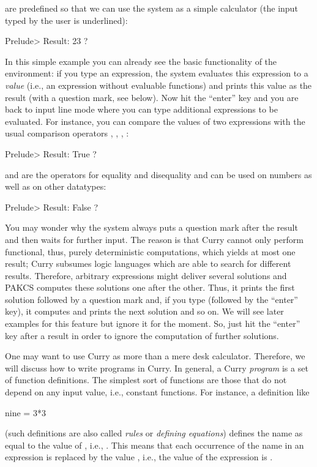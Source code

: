 are predefined so that we can use the system as a simple calculator
(the input typed by the user is underlined):
\begin{prog}
Prelude> 
Result: 23 ? 
\end{prog}
In this simple example you can already see the basic functionality
of the environment: if you type an expression, the system
evaluates this expression to a \emph{value}
(i.e., an expression without evaluable functions)
and prints this value as the result (with a question mark, see below).
Now hit the ``enter'' key and you are back to input line mode
where you can type additional expressions to be evaluated. For instance,
you can compare the values of two expressions with the
usual comparison operators \code{>}, \code{<}, \code{<=}, \code{>=}:
\begin{prog}
Prelude> 
Result: True ? 
\end{prog}
\code{==} and \code{/=} are the operators for equality and disequality
and can be used on numbers as well as on other datatypes:
\begin{prog}
Prelude> 
Result: False ?
\end{prog}
You may wonder why the system always puts a question mark after
the result and then waits for further input.
The reason is that Curry cannot only perform functional, thus,
purely deterministic computations, which yields at most one result;
Curry subsumes logic languages which are able
to search for different results. Therefore, arbitrary
expressions might deliver several solutions and PAKCS
computes these solutions one after the other. Thus, it prints
the first solution followed by a question mark and,
if you type \ccode{;} (followed by
the ``enter'' key), it computes and prints the next solution and so on.
We will see later examples for this feature but ignore it
for the moment. So, just hit the ``enter'' key after a result
in order to ignore the computation of further solutions.

One may want to use Curry as more than a mere desk calculator. Therefore, we will discuss how to write programs in Curry.
In general, a Curry \emph{program}
is a set of function definitions.
The simplest sort of functions are those that do not depend
on any input value, i.e., constant functions.
For instance, a definition like
\begin{prog}
nine = 3*3
\end{prog}
(such definitions are also called \emph{rules}
or \emph{defining equations})
defines the name  as equal to the value of ,
i.e., . This means that each occurrence of the name 
in an expression is replaced by the value , i.e., the value
of the expression  is .

